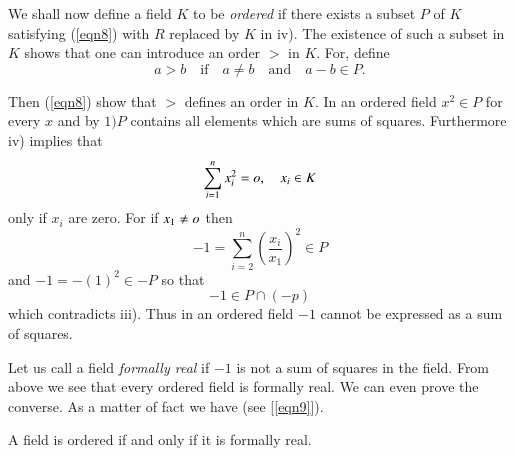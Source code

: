 We shall now define a field $K$ to be \textit{ordered} if there exists
a subset $P$ of $K$ satisfying (\ref{eqn8}) with $R$ replaced by $K$ in
iv). The existence of such a subset in $K$ shows that one can
introduce an order $>$ in $K$. For, define
\begin{equation}\label{eqn9}
a>b\quad \text{if}\quad a\neq b\quad \text{and}\quad a-b\in P.
\end{equation}

Then (\ref{eqn8}) show that $>$ defines an order in
$K$. In an ordered field $x^{2}\in P$ for every $x$ and by $1)P$
contains all elements which are sums of squares. Furthermore iv)
implies that 
$$
\sum\limits_{i=1}^{n} x^{2}_i=o,\quad x_i\in K
$$
only if $x_i$ are zero. For if $x_1\neq o$ then 
\begin{equation*}
-1=\sum\limits_{i=2}^{n}\left(\dfrac{x_i}{x_1}\right)^{2}\in P
\end{equation*}
and $-1=-(1)^{2}\in -P$ so that 
\begin{equation*}
-1\in P\cap(-p)
\end{equation*}
which contradicts iii). Thus in an ordered field $-1$ cannot be
expressed as a sum of squares.

Let us call a field \textit{formally real} if $-1$ is not a sum of
squares in the field. From above we see that every ordered field is
formally real. We can even prove the converse. As a matter of fact we
have (see [\ref{eqn9}]).


\begin{thm}[Artin]\label{thm1}
A field is ordered if and only if it is formally real.
\end{thm}

